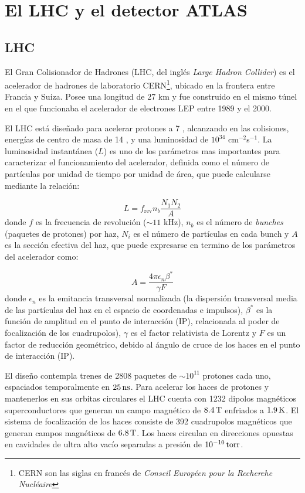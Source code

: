 \chapter{El LHC y el detector ATLAS}
\label{cap:detector}


\section{LHC}

El Gran Colisionador de Hadrones (LHC, del inglés \emph{Large Hadron Collider}) es el
acelerador de hadrones de laboratorio CERN\footnote{CERN son las
  siglas en francés de \emph{Conseil Européen pour la Recherche Nucléaire}}, ubicado en
la frontera entre Francia y Suiza. Posee una longitud de 27 km y fue construido
en el mismo túnel en el que funcionaba el acelerador de electrones LEP entre
1989 y el 2000.

El LHC está diseñado para acelerar protones a 7 \tev, alcanzando en las colisiones, energías de
centro de masa de 14 \tev, y una luminosidad de $10^{34}$ cm$^{-2}$s$^{-1}$. La luminosidad
instantánea ($L$) es uno de los parámetros mas importantes para caracterizar el funcionamiento del
acelerador, definida como el número de
partículas por unidad de tiempo por unidad de área, que puede calcularse
mediante la relación:

\begin{equation}
  L = f_\text{rev} n_b \frac{N_1 N_2}{A}
\end{equation}
%
donde $f$ es la frecuencia de revolución ($\sim 11$ kHz), $n_b$ es el número de
\emph{bunches} (paquetes de protones) por haz, $N_i$ es el número de partículas
en cada bunch y $A$ es la sección efectiva del haz, que puede expresarse en
termino de los parámetros del acelerador como:

\begin{equation}
  A = \frac{4\pi \epsilon_n \beta^{*}}{\gamma F}
\end{equation}
%
donde $\epsilon_n$ es la emitancia transversal normalizada (la dispersión
transversal media de las partículas del haz en el espacio de coordenadas e
impulsos), $\beta^{*}$ es la función de amplitud en el punto de interacción
(IP), relacionada al poder de focalización de los cuadrupolos), $\gamma$ es el
factor relativista de Lorentz y $F$ es un factor de reducción geométrico, debido
al ángulo de cruce de los haces en el punto de interacción (IP).

El diseño contempla trenes de 2808 paquetes de $\sim 10^{11}$ protones cada uno,
espaciados temporalmente en $\unit[25]{ns}$.
Para acelerar los haces de protones y mantenerlos en sus orbitas circulares el
LHC cuenta con 1232 dipolos magnéticos superconductores que generan un campo
magnético de $\unit[8.4]{T}$ enfriados a $\unit[1.9]{K}$. El sistema de focalización de los haces
consiste de 392 cuadrupolos magnéticos que generan campos magnéticos de $\unit[6.8]{T}$.
Los haces circulan en direcciones opuestas en cavidades de ultra alto vacío
separadas a presión de $\unit[10^{-10}]{torr}$.


